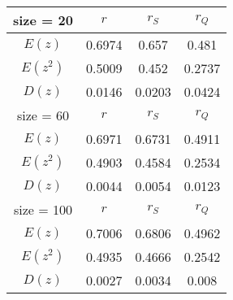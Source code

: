 \begin{tabular}{| c | c | c | c |} \hline
size = 20 & $r$ & $r_S$ & $r_Q$ \\ \hline 
$E(z)$ & 0.6974 & 0.657 & 0.481 \\ 
$E(z^2)$ & 0.5009 & 0.452 & 0.2737 \\ 
$D(z)$ & 0.0146 & 0.0203 & 0.0424 \\ \hline 
size = 60 & $r$ & $r_S$ & $r_Q$ \\ \hline 
$E(z)$ & 0.6971 & 0.6731 & 0.4911 \\ 
$E(z^2)$ & 0.4903 & 0.4584 & 0.2534 \\ 
$D(z)$ & 0.0044 & 0.0054 & 0.0123 \\ \hline 
size = 100 & $r$ & $r_S$ & $r_Q$ \\ \hline 
$E(z)$ & 0.7006 & 0.6806 & 0.4962 \\ 
$E(z^2)$ & 0.4935 & 0.4666 & 0.2542 \\ 
$D(z)$ & 0.0027 & 0.0034 & 0.008 \\ \hline 
\end{tabular}